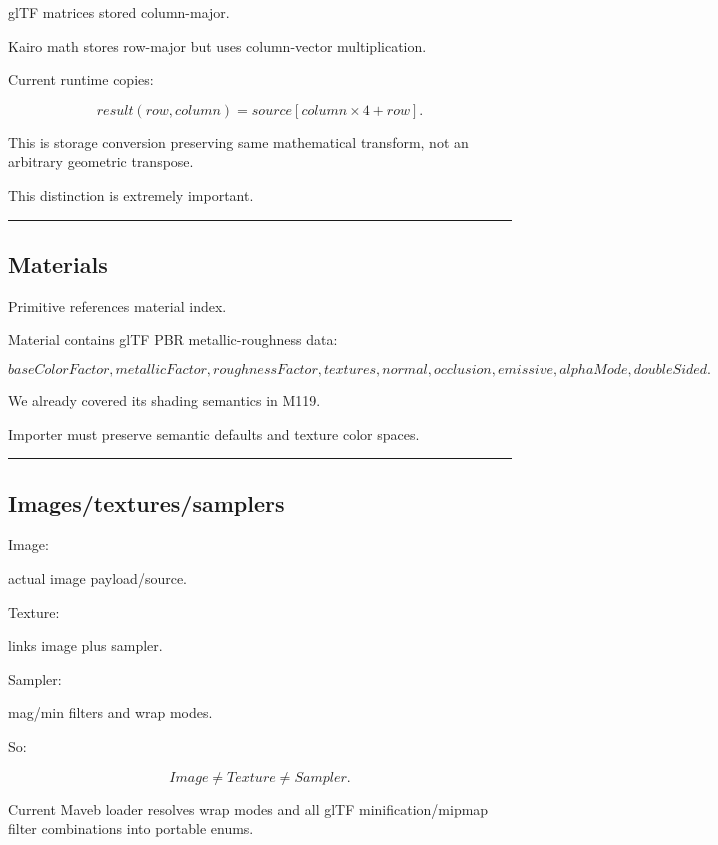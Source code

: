 glTF matrices stored column-major.

Kairo math stores row-major but uses column-vector multiplication.

Current runtime copies:

\[
result(row,column)
=
source[column\times4+row].
\]

This is storage conversion preserving same mathematical transform, not an arbitrary geometric transpose.

This distinction is extremely important.

\begin{center}\rule{0.5\linewidth}{0.5pt}\end{center}

\subsection{Materials}\label{04-visual-computing-ii-ch041-materials}

Primitive references material index.

Material contains glTF PBR metallic-roughness data:

\[
baseColorFactor,
metallicFactor,
roughnessFactor,
textures,
normal,
occlusion,
emissive,
alphaMode,
doubleSided.
\]

We already covered its shading semantics in M119.

Importer must preserve semantic defaults and texture color spaces.

\begin{center}\rule{0.5\linewidth}{0.5pt}\end{center}

\subsection{Images/textures/samplers}\label{04-visual-computing-ii-ch041-imagestexturessamplers}

Image:

actual image payload/source.

Texture:

links image plus sampler.

Sampler:

mag/min filters and wrap modes.

So:

\[
\boxed{
Image
\neq
Texture
\neq
Sampler.
}
\]

Current Maveb loader resolves wrap modes and all glTF minification/mipmap filter combinations into portable enums.

